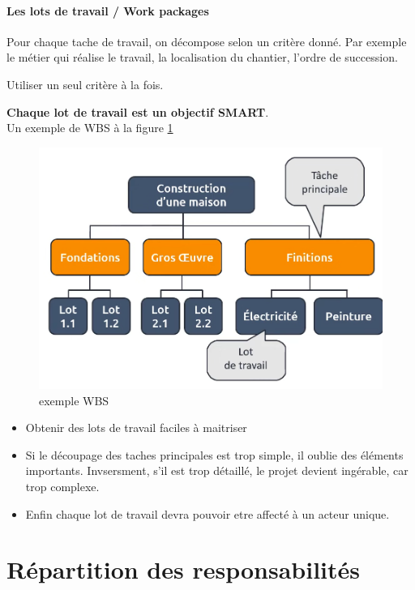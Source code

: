 \paragraph*{Les lots de travail / Work packages}
Pour chaque tache de travail, on décompose selon un critère donné. Par exemple le métier qui réalise le travail, la localisation du chantier, l'ordre de succession.
\begin{danger}
	Utiliser un seul critère à la fois.
\end{danger}
\textbf{Chaque lot de travail est un objectif SMART}.\\
Un exemple de WBS à la figure \ref{fig:exemple_wbs}
\begin{figure}[!h]
	\begin{center}
		\includegraphics[scale=0.2]{images/exemple_wbs.png}
		\caption{exemple WBS}
		\label{fig:exemple_wbs}
	\end{center}
\end{figure}
\begin{danger}
	\begin{itemize}
		\item Obtenir des lots de travail faciles à maitriser
		\item Si le découpage des taches principales est trop simple, il oublie des éléments importants. Invsersment, s'il est trop détaillé, le projet devient ingérable, car trop complexe.
		\item Enfin chaque lot de travail devra pouvoir etre affecté à un acteur unique.
	\end{itemize}
\end{danger}
\section{Répartition des responsabilités}

